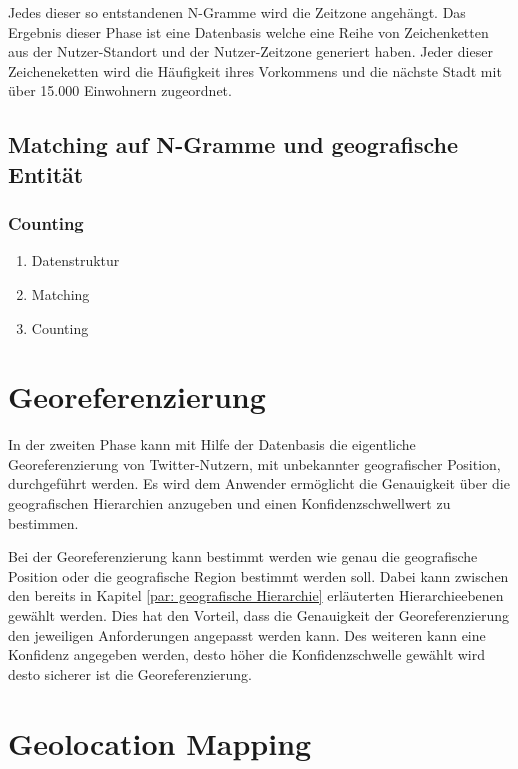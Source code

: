 			  	Jedes dieser so entstandenen N-Gramme wird die Zeitzone angehängt.  
				Das Ergebnis dieser Phase ist eine Datenbasis welche eine Reihe von Zeichenketten aus der Nutzer-Standort und der Nutzer-Zeitzone generiert haben. 
				Jeder dieser Zeicheneketten wird die Häufigkeit ihres Vorkommens und die nächste Stadt mit über 15.000 Einwohnern zugeordnet. 

				
		\subsection{Matching auf N-Gramme und geografische Entität}

			\subsubsection{Counting} 


	\begin{enumerate}
		\item Datenstruktur
		\item Matching
		\item Counting  
	\end{enumerate}

	\section{Georeferenzierung}   
	In der zweiten Phase kann mit Hilfe der Datenbasis die eigentliche Georeferenzierung von Twitter-Nutzern, mit unbekannter geografischer Position, durchgeführt werden. 
	Es wird dem Anwender ermöglicht die Genauigkeit über die geografischen Hierarchien anzugeben und einen Konfidenzschwellwert zu bestimmen.

	Bei der Georeferenzierung kann bestimmt werden wie genau die geografische Position oder die geografische Region bestimmt werden soll. 
	Dabei kann zwischen den bereits in Kapitel \ref{par: geografische Hierarchie} erläuterten Hierarchieebenen gewählt werden.
	Dies hat den Vorteil, dass die Genauigkeit der Georeferenzierung den jeweiligen Anforderungen angepasst werden kann.
	Des weiteren kann eine Konfidenz angegeben werden, desto höher die Konfidenzschwelle gewählt wird desto sicherer ist die Georeferenzierung. 
	
	


\section{Geolocation Mapping}

